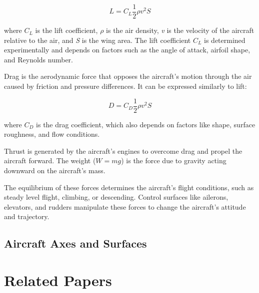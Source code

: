 \begin{equation}
    L = C_L \frac{1}{2} \rho v^2 S
\end{equation}

where $C_L$ is the lift coefficient, \textit{$\rho$} is the air density, \textit{v} is the velocity of the aircraft relative to the air, and \textit{S} is the wing area. The lift coefficient $C_L$ is determined experimentally and depends on factors such as the angle of attack, airfoil shape, and Reynolds number.

Drag is the aerodynamic force that opposes the aircraft's motion through the air caused by friction and pressure differences. It can be expressed similarly to lift:

\begin{equation}
    D = C_D \frac{1}{2} \rho v^2 S
\end{equation}

where $C_D$ is the drag coefficient, which also depends on factors like shape, surface roughness, and flow conditions.

Thrust is generated by the aircraft's engines to overcome drag and propel the aircraft forward. The weight ($W = mg$) is the force due to gravity acting downward on the aircraft's mass.

The equilibrium of these forces determines the aircraft's flight conditions, such as steady level flight, climbing, or descending. Control surfaces like ailerons, elevators, and rudders manipulate these forces to change the aircraft's attitude and trajectory.

\subsection{Aircraft Axes and Surfaces}

\section{Related Papers}